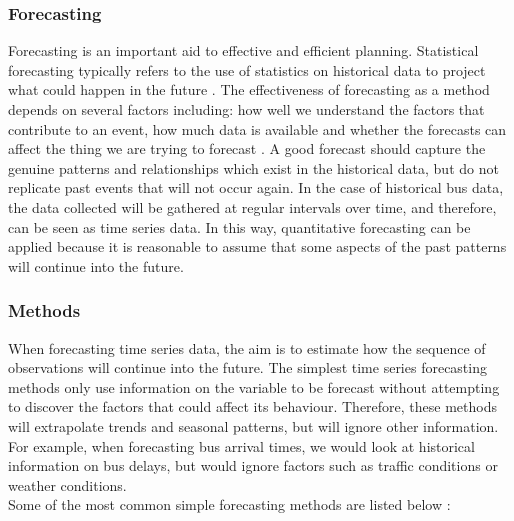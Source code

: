 \subsubsection{Forecasting}
Forecasting is an important aid to effective and efficient planning. Statistical forecasting typically refers to the use of statistics on historical data to project what could happen in the future \cite{what-is-forecasting}. The effectiveness of forecasting as a method depends on several factors including: how well we understand the factors that contribute to an event, how much data is available and whether the forecasts can affect the thing we are trying to forecast \cite{forecasting-book}. A good forecast should capture the genuine patterns and relationships which exist in the historical data, but do not replicate past events that will not occur again. In the case of historical bus data, the data collected will be gathered at regular intervals over time, and therefore, can be seen as time series data. In this way, quantitative forecasting can be applied because it is reasonable to assume that some aspects of the past patterns will continue into the future.

\subsubsection{Methods}

When forecasting time series data, the aim is to estimate how the sequence of observations will continue into the future. The simplest time series forecasting methods only use information on the variable to be forecast without attempting to discover the factors that could affect its behaviour. Therefore, these methods will extrapolate trends and seasonal patterns, but will ignore other information. For example, when forecasting bus arrival times, we would look at historical information on bus delays, but would ignore factors such as traffic conditions or weather conditions. \\

Some of the most common simple forecasting methods are listed below \cite{forecasting-book}:

